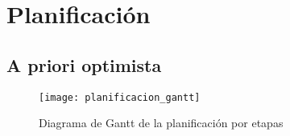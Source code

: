
    \section{Planificación} %
    \label{sec:Planificacion}

        \subsection{A priori optimista} %
        \label{sub:APrioriOptimista}

            \begin{figure}[ht]
                \centering
                \texttt{[image: planificacion\_gantt]}
                \caption{Diagrama de Gantt de la planificación por etapas\label{fig:PlanificacionGantt}}
            \end{figure}






\newpage